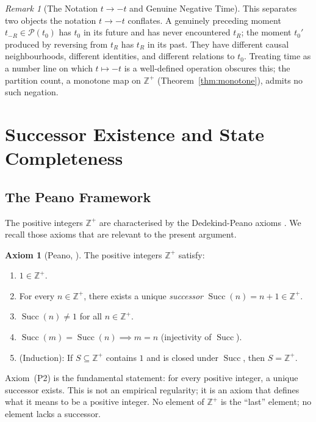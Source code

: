 \documentclass[twocolumn,10pt,a4paper]{article}
\theoremstyle{thmstyle}
\theoremstyle{definition}
\newtheorem{axiom}{Axiom}
\theoremstyle{remark}
\newtheorem{remark}[theorem]{Remark}
\DeclareMathOperator{\Succ}{Succ}
\newcommand{\Zp}{\mathbb{Z}^{+}}
\begin{document}
\begin{remark}[The Notation $t\to -t$ and Genuine Negative Time]
\label{rem:neg-time}
This separates two objects the notation $t\to -t$ conflates. A genuinely
preceding moment $t_{-R}\in\mathcal{P}(t_0)$ has $t_0$ in its future and has
never encountered $t_R$; the moment $t_0'$ produced by reversing from $t_R$ has
$t_R$ in its past. They have different causal neighbourhoods, different
identities, and different relations to $t_0$. Treating time as a number line on
which $t\mapsto -t$ is a well-defined operation obscures this; the partition
count, a monotone map on $\Zp$ (Theorem~\ref{thm:monotone}), admits no such
negation.
\end{remark}

\section{Successor Existence and State Completeness}
\label{sec:successor}

\subsection{The Peano Framework}

The positive integers $\Zp$ are characterised by the Dedekind-Peano axioms \citep{peano1889,dedekind1888}. We recall those axioms that are relevant to the present argument.

\begin{axiom}[Peano, \citealp{peano1889}]
\label{ax:peano}
The positive integers $\Zp$ satisfy:
\begin{enumerate}[leftmargin=1.5em,label=(P\arabic*),itemsep=0.1em]
\item $1 \in \Zp$.
\item For every $n \in \Zp$, there exists a unique \emph{successor} $\Succ(n) = n + 1 \in \Zp$.
\item $\Succ(n) \neq 1$ for all $n \in \Zp$.
\item $\Succ(m) = \Succ(n) \implies m = n$ (injectivity of $\Succ$).
\item (Induction): If $S \subseteq \Zp$ contains $1$ and is closed under $\Succ$, then $S = \Zp$.
\end{enumerate}
\end{axiom}

Axiom~(P2) is the fundamental statement: for every positive integer, a unique successor exists. This is not an empirical regularity; it is an axiom that defines what it means to be a positive integer. No element of $\Zp$ is the ``last'' element; no element lacks a successor.
\end{document}
